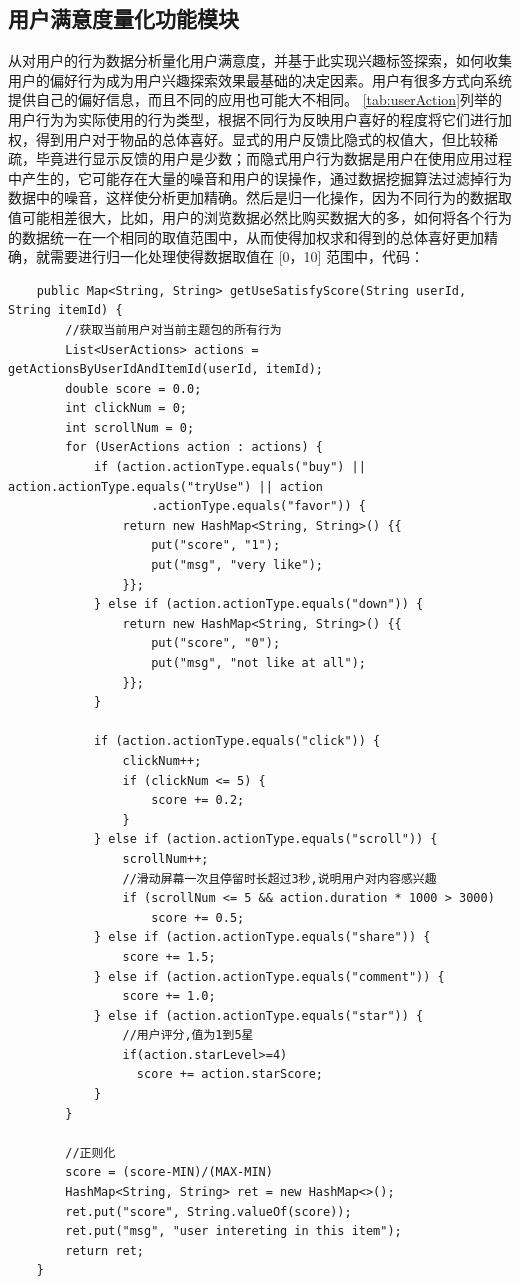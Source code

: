   \subsection{用户满意度量化功能模块}
  从对用户的行为数据分析量化用户满意度，并基于此实现兴趣标签探索，如何收集用户的偏好行为成为用户兴趣探索效果最基础的决定因素。用户有很多方式向系统提供自己的偏好信息，而且不同的应用也可能大不相同。
  \autoref{tab:userAction}列举的用户行为为实际使用的行为类型，根据不同行为反映用户喜好的程度将它们进行加权，得到用户对于物品的总体喜好。显式的用户反馈比隐式的权值大，但比较稀疏，毕竟进行显示反馈的用户是少数；而隐式用户行为数据是用户在使用应用过程中产生的，它可能存在大量的噪音和用户的误操作，通过数据挖掘算法过滤掉行为数据中的噪音，这样使分析更加精确。然后是归一化操作，因为不同行为的数据取值可能相差很大，比如，用户的浏览数据必然比购买数据大的多，如何将各个行为的数据统一在一个相同的取值范围中，从而使得加权求和得到的总体喜好更加精确，就需要进行归一化处理使得数据取值在 [0，10] 范围中，代码：
  \begin{lstlisting}
    public Map<String, String> getUseSatisfyScore(String userId, String itemId) {
        //获取当前用户对当前主题包的所有行为
        List<UserActions> actions = getActionsByUserIdAndItemId(userId, itemId);
        double score = 0.0;
        int clickNum = 0;
        int scrollNum = 0;
        for (UserActions action : actions) {
            if (action.actionType.equals("buy") || action.actionType.equals("tryUse") || action
                    .actionType.equals("favor")) {
                return new HashMap<String, String>() {{
                    put("score", "1");
                    put("msg", "very like");
                }};
            } else if (action.actionType.equals("down")) {
                return new HashMap<String, String>() {{
                    put("score", "0");
                    put("msg", "not like at all");
                }};
            } 

            if (action.actionType.equals("click")) {
                clickNum++;
                if (clickNum <= 5) {
                    score += 0.2;
                }
            } else if (action.actionType.equals("scroll")) {
                scrollNum++;
                //滑动屏幕一次且停留时长超过3秒,说明用户对内容感兴趣
                if (scrollNum <= 5 && action.duration * 1000 > 3000) 
                    score += 0.5;
            } else if (action.actionType.equals("share")) {
                score += 1.5;
            } else if (action.actionType.equals("comment")) {
                score += 1.0;
            } else if (action.actionType.equals("star")) {
                //用户评分,值为1到5星
                if(action.starLevel>=4)
                  score += action.starScore;
            }
        }

        //正则化
        score = (score-MIN)/(MAX-MIN)
        HashMap<String, String> ret = new HashMap<>();
        ret.put("score", String.valueOf(score));
        ret.put("msg", "user intereting in this item");
        return ret;
    }
  \end{lstlisting}

